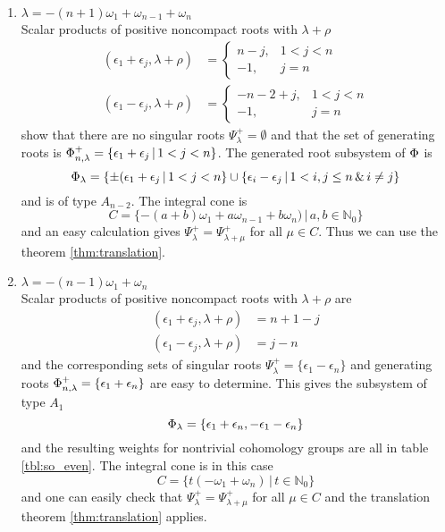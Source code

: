 \begin{enumerate}
 \item $ \lambda = -(n+1)\omega_1 +\omega_{n-1} + \omega_n$\\
   Scalar products of positive noncompact roots with $\lambda+\rho$ 
  \begin{align*}
    (\epsilon_1 + \epsilon_j, \lambda+\rho) & = \begin{cases}
                                                 n-j, & 1<j < n \\
                                                 -1, & j = n
                                                \end{cases}\\
    (\epsilon_1 - \epsilon_j, \lambda+\rho) & = \begin{cases}
                                                 -n-2+j, & 1<j < n \\
                                                 -1, & j = n
                                                \end{cases}
  \end{align*}
  show that there are no singular roots $\Psi^+_\lambda = \emptyset$ and that the set of generating roots is $\Phi^+_{n,\lambda} = \{\epsilon_1 + \epsilon_j \,|\, 1<j<n \}$. The generated root subsystem of $\Phi$ is
  \[
    \Phi_\lambda = \{ \pm(\epsilon_1 + \epsilon_j \,|\, 1<j < n \} \cup \{ \epsilon_i - \epsilon_j \,|\, 1 < i,j \leq n \,\&\, i\neq j \}
  \]
  and is of type $A_{n-2}$. The integral cone is
  \[
   C = \{-(a+b)\omega_1 + a\omega_{n-1} + b\omega_n) \,|\, a,b\in\mathbb{N}_0 \}
  \]
  and an easy calculation gives $\Psi^+_\lambda = \Psi^+_{\lambda+\mu}$ for all $\mu \in C$. Thus we can use the theorem \ref{thm:translation}.
  
 \item $ \lambda = -(n-1)\omega_1 + \omega_n$\\
  Scalar products of positive noncompact roots with $\lambda+\rho$ are
  \begin{align*}
    (\epsilon_1 + \epsilon_j, \lambda+\rho) & = n+1-j\\
    (\epsilon_1 - \epsilon_j, \lambda+\rho) & = j-n
  \end{align*}
  and the corresponding sets of singular roots $\Psi^+_\lambda = \{ \epsilon_1-\epsilon_n\}$ and generating roots $\Phi^+_{n,\lambda} = \{ \epsilon_1 + \epsilon_n \}$ are easy to determine. This gives the subsystem of type $A_1$
  \[
   \Phi_\lambda = \{ \epsilon_1 + \epsilon_n, -\epsilon_1 - \epsilon_n\}
  \]
  and the resulting weights for nontrivial cohomology groups are all in table \ref{tbl:so_even}. The integral cone is in this case \[C = \{t(-\omega_1 + \omega_n) \,|\, t\in\mathbb{N}_0 \}\] and one can easily check that $\Psi^+_\lambda = \Psi^+_{\lambda+\mu}$ for all $\mu \in C$ and the translation theorem \ref{thm:translation} applies.



\end{enumerate}
